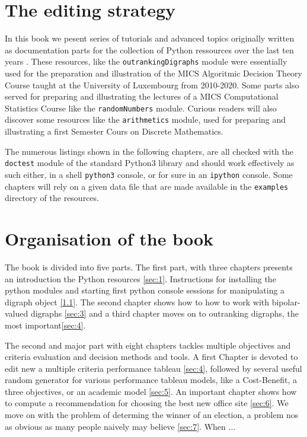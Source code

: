 \label{sec:0}



\section{The editing strategy}

In this book we pesent series of tutorials and advanced topics originally written as documentation parts for the \Digraph collection of Python ressources over the last ten years \citep{BIS-2021}. These \Digraph resources, like the \texttt{outrankingDigraphs} module were essentially used for the preparation and illustration of the MICS Algoritmic Decision Theory Course taught at the University of Luxembourg from 2010-2020. Some parts also served for preparing and illustrating the lectures of a MICS Computational Statistics Course like the \texttt{randomNumbers} module. Curious readers will also discover some resources like the \texttt{arithmetics} module, used for preparing and illustrating a first Semester Cours on Discrete Mathematics.

The numerous listings shown in the following chapters, are all checked with the \texttt{doctest} module of the standard Python3 library and should work effectively as such either, in a shell \texttt{python3} console, or for sure in an \texttt{ipython} console. Some chapters will rely on a given data file that are made available in the \texttt{examples} directory of the \Digraph resources. 



\section{Organisation of the book}
The book is divided into five parts. The first part, with three chapters presents an introduction the \Digraph Python resources \ref{sec:1}. Instructions for installing the python modules and starting first python console sessions for manipulating a digraph object \ref{1.1}. The second chapter shows how to how to work with bipolar-valued digraphs \ref{sec:3} and a third chapter moves on to outranking digraphs, the most important\ref{sec:4}.

The second and major part with eight chapters tackles multiple objectives and criteria evaluation and decision methods and tools. A first Chapter is devoted to edit new a multiple criteria performance tableau \ref{sec:4}, followed by several useful random generator for various performance tableau models, like a Cost-Benefit, a three objectives, or an academic model \ref{sec:5}. An important chapter shows how to compute a recommendation for choosing the best new office site \ref{sec:6}. We move on with the problem of determing the winner of an election, a problem nos as obvious as many people naively may believe \ref{sec:7}. When ...

